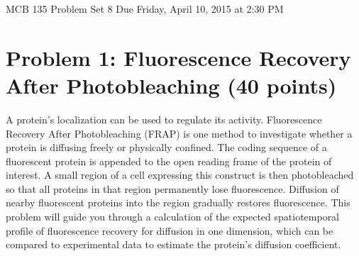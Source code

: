 \documentclass{article}
\begin{document}
\large

MCB 135 Problem Set 8 \hfill Due Friday, April 10, 2015 at 2:30 PM

\section*{Problem 1: Fluorescence Recovery After Photobleaching (40 points)}

A protein's localization can be used to regulate its activity. Fluorescence Recovery After Photobleaching (FRAP) is one method to investigate whether a protein is diffusing freely or physically confined. The coding sequence of a fluorescent protein is appended to the open reading frame of the protein of interest. A small region of a cell expressing this construct is then photobleached so that all proteins in that region permanently lose fluorescence. Diffusion of nearby fluorescent proteins into the region gradually restores fluorescence. This problem will guide you through a calculation of the expected spatiotemporal profile of fluorescence recovery for diffusion in one dimension, which can be compared to experimental data to estimate the protein's diffusion coefficient.
\end{document}
